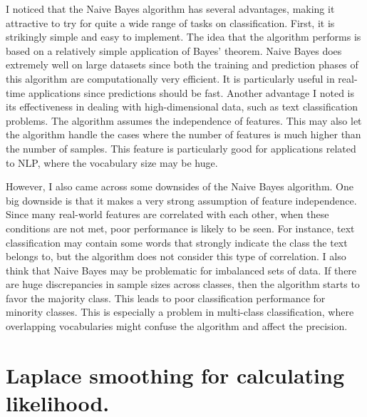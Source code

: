 \documentclass{article}
\begin{document}
I noticed that the Naive Bayes algorithm has several advantages, making it attractive to try for quite a wide range of tasks on classification. First, it is strikingly simple and easy to implement. The idea that the algorithm performs is based on a relatively simple application of Bayes' theorem. Naive Bayes does extremely well on large datasets since both the training and prediction phases of this algorithm are computationally very efficient. It is particularly useful in real-time applications since predictions should be fast. Another advantage I noted is its effectiveness in dealing with high-dimensional data, such as text classification problems. The algorithm assumes the independence of features. This may also let the algorithm handle the cases where the number of features is much higher than the number of samples. This feature is particularly good for applications related to NLP, where the vocabulary size may be huge. 

However, I also came across some downsides of the Naive Bayes algorithm. One big downside is that it makes a very strong assumption of feature independence. Since many real-world features are correlated with each other, when these conditions are not met, poor performance is likely to be seen. For instance, text classification may contain some words that strongly indicate the class the text belongs to, but the algorithm does not consider this type of correlation. I also think that Naive Bayes may be problematic for imbalanced sets of data. If there are huge discrepancies in sample sizes across classes, then the algorithm starts to favor the majority class. This leads to poor classification performance for minority classes. This is especially a problem in multi-class classification, where overlapping vocabularies might confuse the algorithm and affect the precision. 

\section*{Laplace smoothing for calculating likelihood.}
\end{document}
